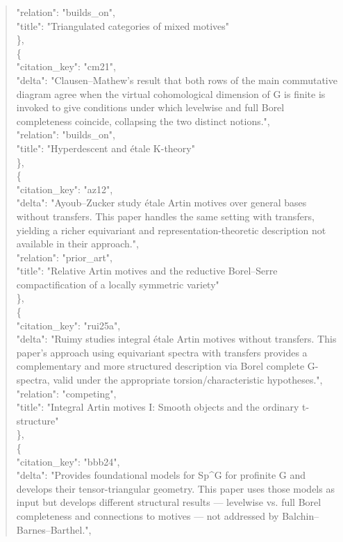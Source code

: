 \documentclass[11pt]{article}
\begin{document}
\begin{quote}
      "relation": "builds\_on",\\
      "title": "Triangulated categories of mixed motives"\\
    \},\\
    \{\\
      "citation\_key": "cm21",\\
      "delta": "Clausen--Mathew's result that both rows of the main commutative diagram agree when the virtual cohomological dimension of G is finite is invoked to give conditions under which levelwise and full Borel completeness coincide, collapsing the two distinct notions.",\\
      "relation": "builds\_on",\\
      "title": "Hyperdescent and étale K-theory"\\
    \},\\
    \{\\
      "citation\_key": "az12",\\
      "delta": "Ayoub--Zucker study étale Artin motives over general bases without transfers. This paper handles the same setting with transfers, yielding a richer equivariant and representation-theoretic description not available in their approach.",\\
      "relation": "prior\_art",\\
      "title": "Relative Artin motives and the reductive Borel--Serre compactification of a locally symmetric variety"\\
    \},\\
    \{\\
      "citation\_key": "rui25a",\\
      "delta": "Ruimy studies integral étale Artin motives without transfers. This paper's approach using equivariant spectra with transfers provides a complementary and more structured description via Borel complete G-spectra, valid under the appropriate torsion/characteristic hypotheses.",\\
      "relation": "competing",\\
      "title": "Integral Artin motives I: Smooth objects and the ordinary t-structure"\\
    \},\\
    \{\\
      "citation\_key": "bbb24",\\
      "delta": "Provides foundational models for Sp\^{}G for profinite G and develops their tensor-triangular geometry. This paper uses those models as input but develops different structural results --- levelwise vs. full Borel completeness and connections to motives --- not addressed by Balchin--Barnes--Barthel.",\\

\end{quote}
\end{document}
